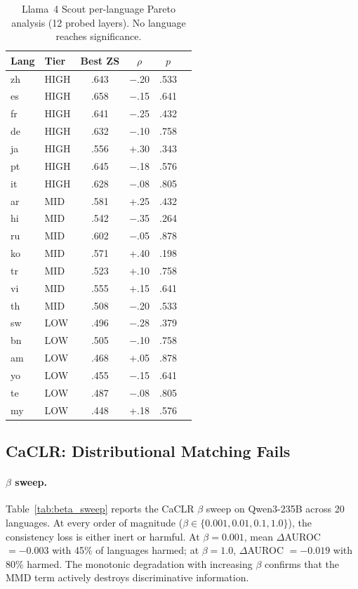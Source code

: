 \documentclass[11pt,a4paper]{article}
\newcommand{\auroc}{AUROC}
\begin{document}
\begin{table}[t]
\centering
\small
\caption{Llama~4 Scout per-language Pareto analysis (12 probed layers). No language reaches significance.}
\label{tab:pareto_llama}
\begin{tabular}{llcccc}
\toprule
Lang & Tier & Best ZS & $\rho$ & $p$ \\
\midrule
zh & HIGH & .643 & $-$.20 & .533 \\
es & HIGH & .658 & $-$.15 & .641 \\
fr & HIGH & .641 & $-$.25 & .432 \\
de & HIGH & .632 & $-$.10 & .758 \\
ja & HIGH & .556 & +.30 & .343 \\
pt & HIGH & .645 & $-$.18 & .576 \\
it & HIGH & .628 & $-$.08 & .805 \\
\midrule
ar & MID & .581 & +.25 & .432 \\
hi & MID & .542 & $-$.35 & .264 \\
ru & MID & .602 & $-$.05 & .878 \\
ko & MID & .571 & +.40 & .198 \\
tr & MID & .523 & +.10 & .758 \\
vi & MID & .555 & +.15 & .641 \\
th & MID & .508 & $-$.20 & .533 \\
\midrule
sw & LOW & .496 & $-$.28 & .379 \\
bn & LOW & .505 & $-$.10 & .758 \\
am & LOW & .468 & +.05 & .878 \\
yo & LOW & .455 & $-$.15 & .641 \\
te & LOW & .487 & $-$.08 & .805 \\
my & LOW & .448 & +.18 & .576 \\
\bottomrule
\end{tabular}
\end{table}

\subsection{CaCLR: Distributional Matching Fails}
\label{sec:caclr}

\paragraph{$\beta$ sweep.}
Table~\ref{tab:beta_sweep} reports the CaCLR $\beta$ sweep on Qwen3-235B across 20 languages.
At every order of magnitude ($\beta \in \{0.001, 0.01, 0.1, 1.0\}$), the consistency loss is either inert or harmful.
At $\beta = 0.001$, mean $\Delta$\auroc{} $= -0.003$ with 45\% of languages harmed; at $\beta = 1.0$, $\Delta$\auroc{} $= -0.019$ with 80\% harmed.
The monotonic degradation with increasing $\beta$ confirms that the MMD term actively destroys discriminative information.
\end{document}
